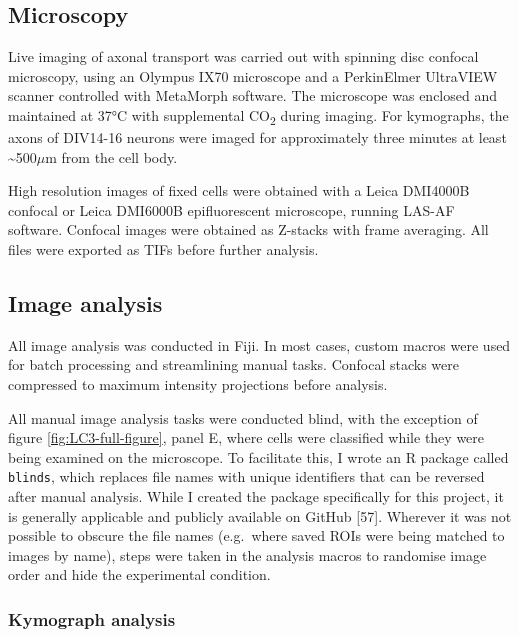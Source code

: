 \documentclass[
  12pt,
  a4paper,
]{book}
\begin{document}
\hypertarget{microscopy}{%
\subsection{Microscopy}\label{microscopy}}

Live imaging of axonal transport was carried out with spinning disc confocal microscopy, using an Olympus IX70 microscope and a PerkinElmer UltraVIEW scanner controlled with MetaMorph software. The microscope was enclosed and maintained at 37°C with supplemental CO\textsubscript{2} during imaging. For kymographs, the axons of DIV14-16 neurons were imaged for approximately three minutes at least \textasciitilde500\(\mu\)m from the cell body.

High resolution images of fixed cells were obtained with a Leica DMI4000B confocal or Leica DMI6000B epifluorescent microscope, running LAS-AF software. Confocal images were obtained as Z-stacks with frame averaging. All files were exported as TIFs before further analysis.

\hypertarget{image-analysis}{%
\subsection{Image analysis}\label{image-analysis}}

All image analysis was conducted in Fiji. In most cases, custom macros were used for batch processing and streamlining manual tasks. Confocal stacks were compressed to maximum intensity projections before analysis.

All manual image analysis tasks were conducted blind, with the exception of figure \ref{fig:LC3-full-figure}, panel E, where cells were classified while they were being examined on the microscope. To facilitate this, I wrote an R package called \texttt{blinds}, which replaces file names with unique identifiers that can be reversed after manual analysis. While I created the package specifically for this project, it is generally applicable and publicly available on GitHub {[}57{]}. Wherever it was not possible to obscure the file names (e.g.~where saved ROIs were being matched to images by name), steps were taken in the analysis macros to randomise image order and hide the experimental condition.

\hypertarget{kymo}{%
\subsubsection{Kymograph analysis}\label{kymo}}
\end{document}
